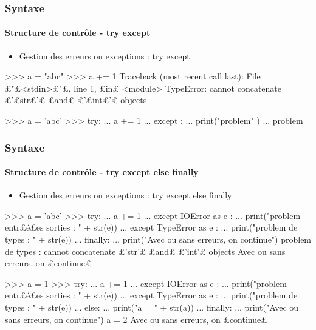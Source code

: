 \begin{frame}[fragile]
\frametitle{Syntaxe}
\framesubtitle{Structure de contrôle - try except}
\begin{itemize}
\item Gestion des erreurs ou exceptions : try except 
\end{itemize}
\begin{pythonConsole}
>>> a = "abc"
>>> a += 1
Traceback (most recent call last):
  File £"£<stdin>£"£, line 1, £in£ <module>
TypeError: cannot concatenate £'£str£'£ £and£ £'£int£'£ objects
\end{pythonConsole}
\begin{pythonConsole}
>>> a = 'abc'
>>> try: 
...     a += 1
... except : 
...     print("problem" )
... 
problem
\end{pythonConsole}
\end{frame}
\begin{frame}[fragile]
\frametitle{Syntaxe}
\framesubtitle{Structure de contrôle - try except else finally}
\begin{itemize}
\item Gestion des erreurs ou exceptions : try except else finally 
\end{itemize}
\begin{pythonConsole}
>>> a = 'abc'
>>> try: 
...     a += 1
... except IOError as e :
...     print("problem entr£{\color{magenta}é}£es sorties : " + str(e))
... except TypeError as e :
...     print("problem de types : " + str(e))
... finally:
...     print("Avec ou sans erreurs, on continue")
problem de types : cannot concatenate £'str'£ £and£ £'int'£ objects
Avec ou sans erreurs, on £continue£
\end{pythonConsole}
\begin{pythonConsole}
>>> a = 1
>>> try: 
...     a += 1
... except IOError as e :
...     print("problem entr£{\color{magenta}é}£es sorties : " + str(e))
... except TypeError as e :
...     print("problem de types : " + str(e))
... else: 
...     print("a = " + str(a))
... finally:
...     print("Avec ou sans erreurs, on continue")
a = 2
Avec ou sans erreurs, on £continue£
\end{pythonConsole}
\end{frame}
